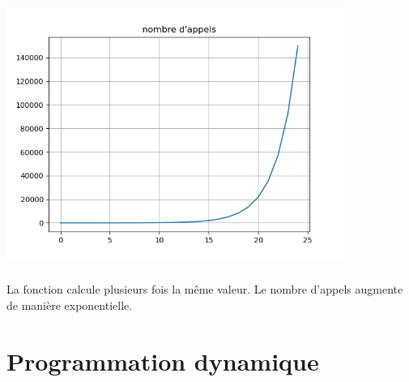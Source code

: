 \documentclass[svgnames,11pt]{beamer}
\begin{document}
\begin{frame}
    \frametitle{}
    \begin{center}
        \centering
        \includegraphics[width=11cm]{ressources/nb-appels.png}
    \end{center}
\end{frame}
\begin{frame}
    \frametitle{}

    \begin{aretenir}[Remarque]
    La fonction calcule plusieurs fois la même valeur. Le nombre d'appels augmente de manière exponentielle.
    \end{aretenir}

\end{frame}
\section{Programmation dynamique}
\end{document}
